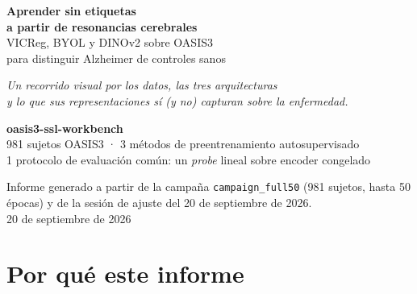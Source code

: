 \documentclass[11pt,a4paper]{article}
\begin{document}
\begin{titlepage}
\centering
\vspace*{1.2cm}
{\Huge\bfseries\color{primaryblue} Aprender sin etiquetas\\[2pt] a partir de resonancias cerebrales}\\[10pt]
{\Large\color{steelblue} VICReg, BYOL y DINOv2 sobre OASIS3\\ para distinguir Alzheimer de controles sanos}\\[26pt]


\vspace{18pt}
{\large \textit{Un recorrido visual por los datos, las tres arquitecturas\\
y lo que sus representaciones sí (y no) capturan sobre la enfermedad.}}

\vspace{40pt}
\begin{tcolorbox}[colback=panelbg,colframe=primaryblue,arc=4pt,width=0.82\textwidth,
  boxrule=1pt, left=14pt,right=14pt,top=10pt,bottom=10pt]
\begin{center}
\textbf{oasis3-ssl-workbench}\\[4pt]
\small 981 sujetos OASIS3 · 3 métodos de preentrenamiento autosupervisado\\
1 protocolo de evaluación común: un \emph{probe} lineal sobre encoder congelado
\end{center}
\end{tcolorbox}

\vfill
{\small Informe generado a partir de la campaña \texttt{campaign\_full50} (981 sujetos,
hasta 50 épocas) y de la sesión de ajuste del 20 de septiembre de 2026.}\\[4pt]
{\small 20 de septiembre de 2026}
\end{titlepage}

\tableofcontents
\newpage

\section{Por qué este informe}
\end{document}
